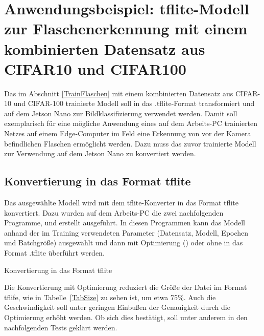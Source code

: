 %
%
%


\section{Anwendungsbeispiel: tflite-Modell zur Flaschenerkennung mit einem kombinierten Datensatz aus CIFAR10 und CIFAR100}

Das im Abschnitt \ref{TrainFlaschen} 
mit einem kombinierten Datensatz aus CIFAR-10 und CIFAR-100 trainierte Modell soll in das .tflite-Format transformiert und auf dem  Jetson Nano zur Bildklassifizierung verwendet werden. Damit soll exemplarisch für eine mögliche Anwendung eines auf dem Arbeits-PC trainierten Netzes auf einem Edge-Computer im Feld eine Erkennung von vor der Kamera befindlichen Flaschen ermöglicht werden. Dazu muss das zuvor trainierte Modell zur Verwendung auf dem Jetson Nano zu  konvertiert werden.

\subsection{Konvertierung in das Format tflite}

Das ausgewählte Modell wird mit dem tflite-Konverter in das Format tflite konvertiert. Dazu wurden auf dem Arbeits-PC die zwei nachfolgenden Programme,  und  erstellt ausgeführt. In diesen Programmen kann das Modell anhand der im Training verwendeten Parameter (Datensatz, Modell, 
Epochen und Batchgröße) ausgewählt und dann mit Optimierung () oder ohne
in das Format .tflite überführt werden.

\begin{code}
  
  

  \caption{Konvertierung in das Format tflite}
\end{code}

Die Konvertierung mit Optimierung reduziert die Größe der Datei im Format tflife, wie in Tabelle~\ref{TabSize} zu sehen ist, um etwa 75\%. Auch die Geschwindigkeit soll unter geringen Einbußen der Genauigkeit durch die Optimierung erhöht werden. Ob sich dies bestätigt, soll unter anderem in den nachfolgenden Tests geklärt werden.

